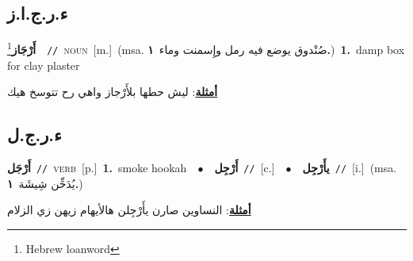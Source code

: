 \documentclass[10pt,a4paper,twoside]{article} %
\begin{document}
\begin{multicols}{2}
\vspace{-3mm}
\subsection*{\color{blue}\foreignlanguage{arabic}{ء.ر.ج.ا.ز}\color{blue}{ (ntws)}} 

{\setlength\topsep{0pt}\textbf{\foreignlanguage{arabic}{أَرْجَاز}}\footnote{Hebrew loanword}\ \ {\color{gray}\texttt{//}\color{black}}\ \textsc{noun}\ [m.]\ \color{gray}(msa. \foreignlanguage{arabic}{صُنْدوق يوضع فيه رمل وإِسمنت وماء}~\foreignlanguage{arabic}{\textbf{١.}})\color{black}\ \textbf{1.}~damp box for clay plaster\  \begin{flushright}\color{gray}\foreignlanguage{arabic}{\textbf{\underline{\foreignlanguage{arabic}{أمثلة}}}: ليش حطها بلأَرْجاز واهي رح تتوسخ هيك}\end{flushright}\color{black}} \vspace{2mm}

\vspace{-3mm}
\subsection*{\color{blue}\foreignlanguage{arabic}{ء.ر.ج.ل}\color{blue}{ (ntws)}} 

{\setlength\topsep{0pt}\textbf{\foreignlanguage{arabic}{أَرْجَل}}\ {\color{gray}\texttt{//}\color{black}}\ \textsc{verb}\ [p.]\ \textbf{1.}~smoke hookah\ \ $\bullet$\ \ \setlength\topsep{0pt}\textbf{\foreignlanguage{arabic}{أَرْجِل}}\ {\color{gray}\texttt{//}\color{black}}\ [c.]\ \ $\bullet$\ \ \setlength\topsep{0pt}\textbf{\foreignlanguage{arabic}{يأَرْجِل}}\ {\color{gray}\texttt{//}\color{black}}\ [i.]\ \color{gray}(msa. \foreignlanguage{arabic}{يُدَخِّن شِيشَة}~\foreignlanguage{arabic}{\textbf{١.}})\color{black}\  \begin{flushright}\color{gray}\foreignlanguage{arabic}{\textbf{\underline{\foreignlanguage{arabic}{أمثلة}}}: النساوين صارن يأَرْجِلن هالأيهام زيهن زي الزلام}\end{flushright}\color{black}} \vspace{2mm}


\end{multicols}
\end{document}
